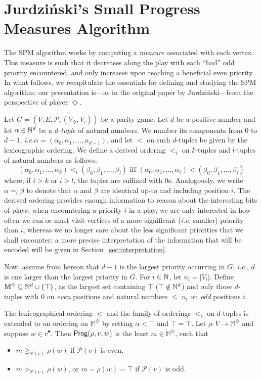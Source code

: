 \documentclass{eptcs}
\newcommand{\odd}{\ensuremath{\square}\xspace}
\newcommand{\even}{\ensuremath{\Diamond}\xspace}
\newcommand{\post}[1]{\ensuremath{#1^{\bullet}}}
\newcommand{\ie}{\emph{i.e.}\xspace}
\newcommand{\priosym}{\mathcal{P}}
\newcommand{\prio}[1]{\priosym(#1)}
\begin{document}
\section{Jurdzi\'nski's Small Progress Measures Algorithm}
\label{sec:spm}

The SPM algorithm works by computing a \emph{measure} associated with
each vertex. This measure is such
that it decreases along the play with each ``bad'' odd priority
encountered, and only increases upon reaching a beneficial even
priority. In what follows, we recapitulate the essentials for defining
and studying the SPM algorithm; our presentation is---as in
the original paper by Jurdzi\'nski---from the perspective of player
$\even$. \medskip

Let $G = (V, E, \priosym, (V_{\even}, V_{\odd}))$ be a parity game.
Let $d$ be a positive number and let $\alpha
\in \mathbb{N}^d$ be a \emph{$d$-tuple} of natural numbers.  We number
its components from $0$ to $d-1$, \ie $\alpha = (\alpha_0, \alpha_1,
\dots, \alpha_{d-1})$, and let $<$ on such $d$-tuples be given by
the lexicographic ordering. We define a derived ordering $<_i$ on $k$-tuples and
$l$-tuples of natural numbers as follows:
\[
(\alpha_0, \alpha_1, \dots, \alpha_k) <_i (\beta_0,\beta_1,\dots,\beta_l)
\text{ iff }
(\alpha_0, \alpha_1, \dots, \alpha_i) < (\beta_0,\beta_1,\dots,\beta_i)
\]
where, if $i > k$ or $i >l$, the tuples are suffixed with $0$s.
Analogously, we write $\alpha =_i \beta$ to denote that $\alpha$ and
$\beta$ are identical up-to and including position $i$.
The derived ordering provides enough information to
reason about the interesting bits of plays: when encountering a
priority $i$ in a play, we are only interested in how often we can
or must visit vertices of a more significant (\ie smaller) priority
than $i$,  whereas we no longer care about the less significant priorities that we shall encounter; a more precise interpretation of the information that will be encoded will be given in Section~\ref{sec:interpretation}. 
\medskip

Now, assume from hereon that $d-1$ is the largest priority occurring in
$G$; \ie, $d$ is one larger than the largest priority
in $G$.  For $i \in \mathbb{N}$, let $n_i = |V_i|$. 
Define $\mathbb{M}^{\even} \subseteq \Nat^d \cup \{\top\}$, as the largest
set containing $\top$
($\top \notin \mathbb{N}^d$) and
only those $d$-tuples with $0$ on \emph{even} positions and
natural numbers $\leq$ $n_i$ on \emph{odd} positions $i$.

The lexicographical ordering $<$ and the family of orderings
$<_i$ on $d$-tuples is extended to an ordering on $\mathbb{M}^\even$
by setting $\alpha < \top$ and $\top = \top$. 
Let $\rho {:} V \to \mathbb{M}^\even$ and suppose $w \in \post{v}$. Then
$\textsf{Prog}(\rho,v,w)$ is the least $m \in \mathbb{M}^{\even}$, such that
\begin{itemize}
  \item $m \geq_{\prio{v}} \rho(w)$ if $\prio{v}$ is even,
  \item $m >_{\prio{v}} \rho(w)$, or $m = \rho(w) = \top$ if $\prio{v}$ is odd.
\end{itemize}
\end{document}
